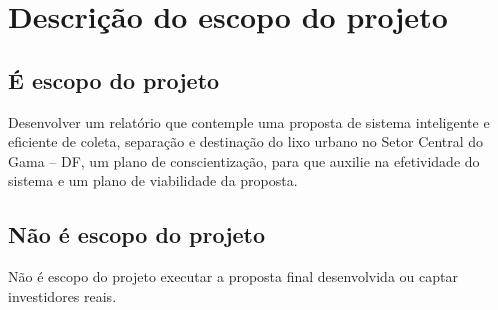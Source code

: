 \section{Descrição do escopo do projeto}

  \subsection{É escopo do projeto}

    Desenvolver um relatório que contemple uma proposta de sistema inteligente e eficiente de coleta,
    separação e destinação do lixo urbano no Setor Central do Gama – DF, um plano de conscientização,
    para que auxilie na efetividade do sistema e um plano de viabilidade da proposta.

  \subsection{Não é escopo do projeto}

    Não é escopo do projeto executar a proposta final desenvolvida ou captar investidores reais.
